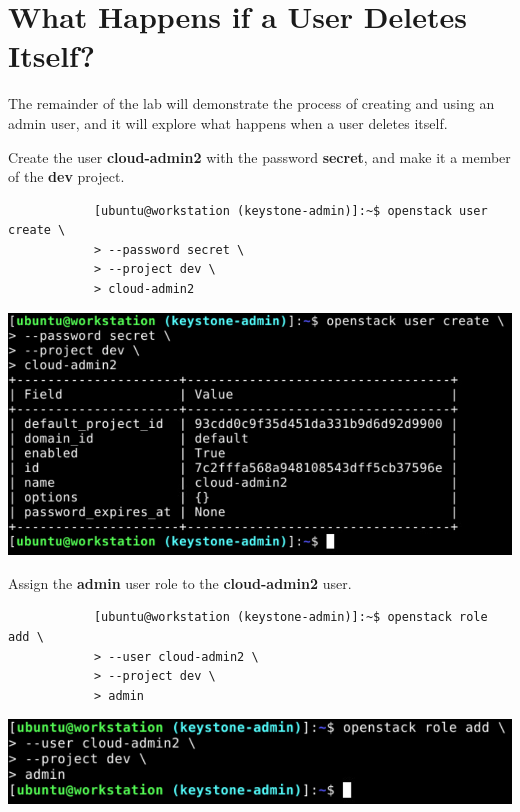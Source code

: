 \documentclass[letterpaper, 12pt]{article}
\begin{document}
\appendix
\section{What Happens if a User Deletes Itself?}
The remainder of the lab will demonstrate the process of creating and using an admin user, and it will explore what happens when a user deletes itself.

\begin{enumerate}
    \begin{labstep}
        Create the user \textbf{cloud-admin2} with the password \textbf{secret}, and make it a member of the
        \textbf{dev} project.
        \begin{lstlisting}
            [ubuntu@workstation (keystone-admin)]:~$ openstack user create \
            > --password secret \
            > --project dev \
            > cloud-admin2
        \end{lstlisting}

        \begin{center}
            \includegraphics[width=\linewidth]{images/appendix/step1.png}
        \end{center}
    \end{labstep}

    \begin{labstep}
        Assign the \textbf{admin} user role to the \textbf{cloud-admin2} user.
        \begin{lstlisting}
            [ubuntu@workstation (keystone-admin)]:~$ openstack role add \
            > --user cloud-admin2 \
            > --project dev \
            > admin
        \end{lstlisting}

        \begin{center}
            \includegraphics[width=\linewidth]{images/appendix/step2.png}
        \end{center}
    \end{labstep}


\end{enumerate}
\end{document}
